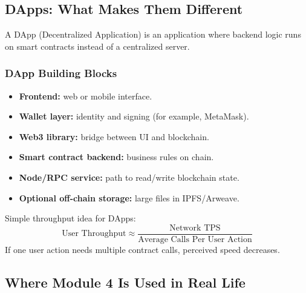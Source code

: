 \documentclass[12pt,a4paper]{article}
\begin{document}
\subsection{DApps: What Makes Them Different}
A DApp (Decentralized Application) is an application where backend logic runs on smart contracts instead of a centralized server.

\subsubsection*{DApp Building Blocks}
\begin{itemize}
\item \textbf{Frontend:} web or mobile interface.
\item \textbf{Wallet layer:} identity and signing (for example, MetaMask).
\item \textbf{Web3 library:} bridge between UI and blockchain.
\item \textbf{Smart contract backend:} business rules on chain.
\item \textbf{Node/RPC service:} path to read/write blockchain state.
\item \textbf{Optional off-chain storage:} large files in IPFS/Arweave.
\end{itemize}

\begin{center}
\end{center}

Simple throughput idea for DApps:
\[
\text{User Throughput} \approx \frac{\text{Network TPS}}{\text{Average Calls Per User Action}}
\]
If one user action needs multiple contract calls, perceived speed decreases.

\subsection{Where Module 4 Is Used in Real Life}
\end{document}
